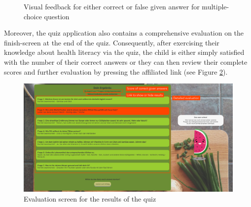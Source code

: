 \begin{figure}[!ht]
    \centering
    \qquad
    \caption[
        Visual feedback for either correct or false given answer for multiple-choice question %
    ]{
        Visual feedback for either correct or false given answer for multiple-choice question
    }
    \label{figure:Answers}
\end{figure}

Moreover, the quiz application also contains a comprehensive evaluation on the finish-screen at the end of the quiz. Consequently, after exercising their knowledge about health literacy via the quiz, the child is either simply satisfied with the number of their correct answers or they can then review their complete scores and further evaluation by pressing the affiliated link (see Figure \ref{figure:Evaluation}).
\begin{figure}[!ht]
    \centering
    \includegraphics[width=1 \linewidth]{images/evaluation.png}
    \caption{
        Evaluation screen for the results of the quiz
    }
    \label{figure:Evaluation}
\end{figure}

